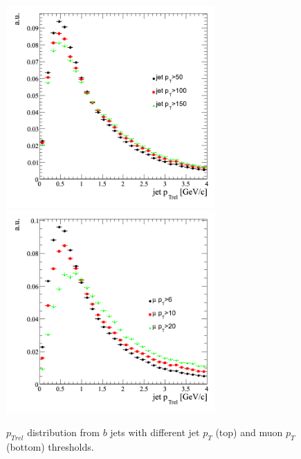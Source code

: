 \begin{figure}[htbp]
  \begin{center}
    \includegraphics[width=80mm]{Figures/jet_ptrelc_jetcuts.png}
    \includegraphics[width=80mm]{Figures/jet_ptrelc_mucuts.png}
  \end{center}
  \caption{$p_{Trel}$ distribution from $b$ jets with different jet $p_T$ (top) and muon $p_T$ (bottom) thresholds.}
  \label{fig:jet_ptrel_c_cuts}
\end{figure}

